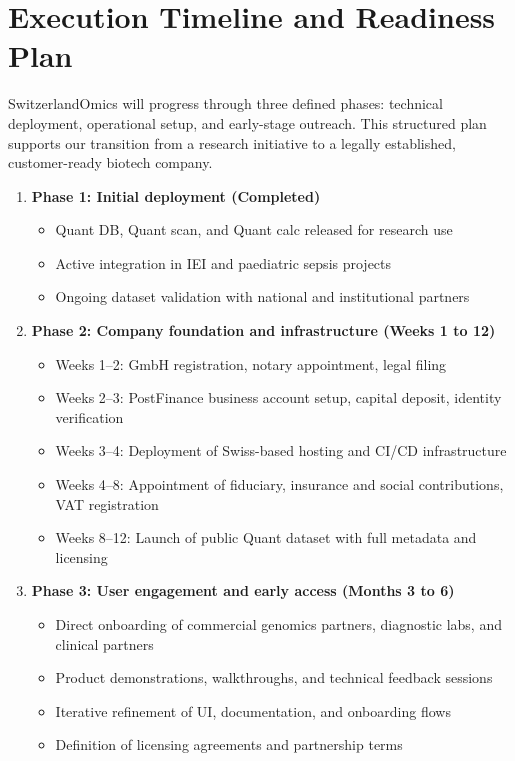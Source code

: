 \documentclass[preprint,12pt,fleqn]{article}
\begin{document}
\section{Execution Timeline and Readiness Plan}

SwitzerlandOmics will progress through three defined phases: technical deployment, operational setup, and early-stage outreach. This structured plan supports our transition from a research initiative to a legally established, customer-ready biotech company.

\begin{enumerate}
  \item \textbf{Phase 1: Initial deployment (Completed)}
  \begin{itemize}
    \item Quant DB, Quant scan, and Quant calc released for research use
    \item Active integration in IEI and paediatric sepsis projects
    \item Ongoing dataset validation with national and institutional partners
  \end{itemize}

  \item \textbf{Phase 2: Company foundation and infrastructure (Weeks 1 to 12)}
  \begin{itemize}
    \item Weeks 1–2: GmbH registration, notary appointment, legal filing
    \item Weeks 2–3: PostFinance business account setup, capital deposit, identity verification
    \item Weeks 3–4: Deployment of Swiss-based hosting and CI/CD infrastructure
    \item Weeks 4–8: Appointment of fiduciary, insurance and social contributions, VAT registration
    \item Weeks 8–12: Launch of public Quant dataset with full metadata and licensing
  \end{itemize}

  \item \textbf{Phase 3: User engagement and early access (Months 3 to 6)}
  \begin{itemize}
    \item Direct onboarding of commercial genomics partners, diagnostic labs, and clinical partners
    \item Product demonstrations, walkthroughs, and technical feedback sessions
    \item Iterative refinement of UI, documentation, and onboarding flows
    \item Definition of licensing agreements and partnership terms
  \end{itemize}
\end{enumerate}
\end{document}
